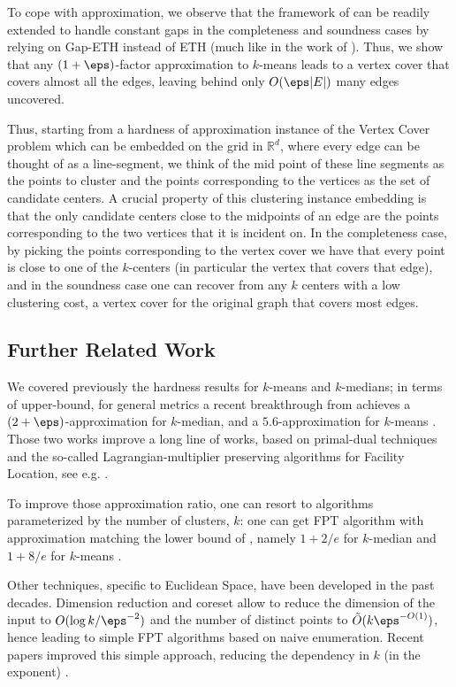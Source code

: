 To cope with approximation, we observe that the framework of \cite{de2018framework} can be readily extended to handle constant gaps in the completeness and soundness cases by relying on Gap-ETH \cite{D16,MR16} instead of ETH (much like in the work of \cite{Kisfaludi-BakNW21}). Thus, we show that any $(1+\eps)$-factor approximation to $k$-means leads to a vertex cover that covers almost all the edges, leaving behind only $O(\eps |E|)$ many edges uncovered.

Thus, starting from a hardness of approximation instance    of the Vertex Cover problem which can be embedded on the grid in $\mathbb{R}^d$, where every edge can be thought of as a line-segment, we think of the mid point of these line segments as the points to cluster and the points corresponding to the vertices as the set of candidate centers. A crucial property of this clustering instance embedding is that the only candidate centers close to the midpoints of an edge are the points corresponding to the two vertices that it is incident on. In the completeness case, by picking the points corresponding to the vertex cover we have that every point is close to one of the $k$-centers (in particular the vertex that covers that edge), and in the soundness case one can recover from any $k$ centers with a low clustering cost, a vertex cover for the original graph that covers most edges. 




\subsection{Further Related Work}\label{app:relatedWork}

We covered previously the hardness results for $k$-means and $k$-medians; in terms of upper-bound, for general metrics a recent breakthrough from \cite{Cohen-Addad0LSS25} achieves a $(2+\eps)$-approximation for $k$-median, and a $5.6$-approximation for $k$-means \cite{kmeans}. Those two works improve a long line of works, based on primal-dual techniques and the so-called Lagrangian-multiplier preserving algorithms for Facility Location, see e.g. \cite{JainV01, JMS02, LiS16}. 

To improve those approximation ratio, one can resort to algorithms parameterized by the number of clusters, $k$: one can get FPT algorithm with approximation matching the lower bound of \cite{JMS02}, namely $1+2/e$ for $k$-median and $1+8/e$ for $k$-means \cite{Cohen-AddadG0LL19}. 

Other techniques, specific to Euclidean Space, have been developed in the past decades. Dimension reduction \cite{MakarychevMR19} and coreset \cite{Cohen-AddadSS21} allow to reduce the dimension of the input to $O(\log k / \eps^{-2})$ and the number of distinct points to $\tilde{O}(k \eps^{-O(1)})$, hence leading to simple FPT algorithms based on naive enumeration.
Recent papers improved this simple approach, reducing the dependency in $k$ (in the exponent) \cite{AbbasiBBCGKMSS23}. 

